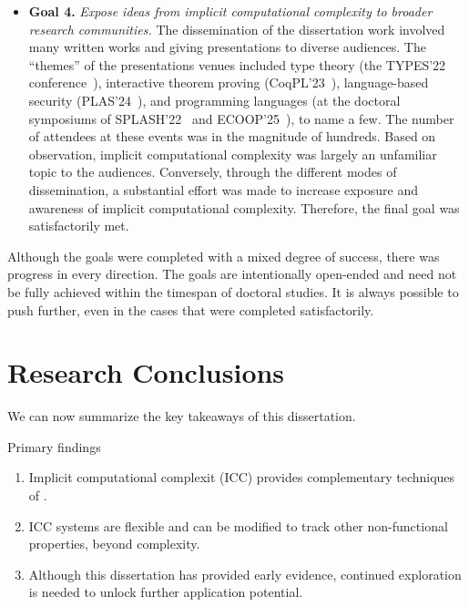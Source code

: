 \begin{itemize}
\item[\iconDONE]\textbf{Goal 4.}
\emph{Expose ideas from implicit computational complexity to broader research
communities.} The dissemination of the dissertation work involved many written
works and giving presentations to diverse audiences. The \enquote{themes} of the
presentations venues included type theory (the TYPES'22
conference~\cite{aubert202217}), interactive theorem proving
(CoqPL'23~\cite{aubert20231}), language-based security
(PLAS'24~\cite{plas2024}), and programming languages (at the doctoral
symposiums of SPLASH'22~\cite{splash22} and ECOOP'25~\cite{rusch20257}), to name
a few. The number of attendees at these events was in the magnitude of hundreds.
Based on observation, implicit computational complexity was largely an
unfamiliar topic to the audiences. Conversely, through the different modes of
dissemination, a substantial effort was made to increase exposure and awareness
of implicit computational complexity. Therefore, the final goal was
satisfactorily met.

\end{itemize}

Although the goals were completed with a mixed degree of success, there was
progress in every direction. The goals are intentionally open-ended and need not
be fully achieved within the timespan of doctoral studies. It is always possible
to push further, even in the cases that were completed satisfactorily.

\section{Research Conclusions}
\label{ssec:findings}

We can now summarize the key takeaways of this dissertation.

\begin{infobox}{Primary findings}
\begin{enumerate}[wide, labelwidth=!, labelindent=0pt]

\item Implicit computational complexit (ICC) provides complementary
techniques of .

\item ICC systems are flexible and can be modified to track other
non-functional properties, beyond complexity. 

\item Although this dissertation has provided early evidence, continued
exploration is needed to unlock further application potential.

\end{enumerate}
\end{infobox}

